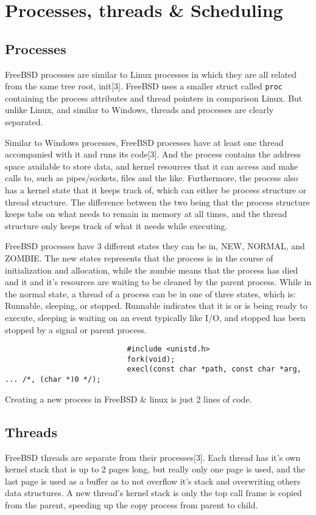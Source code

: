 \documentclass{article}
\begin{document}
\section{Processes, threads \& Scheduling}
\subsection{Processes}
	FreeBSD processes are similar to Linux processes in which they are all related from the same tree root, init[3]. FreeBSD uses a smaller struct called \texttt{proc} containing the process attributes and thread pointers in comparison Linux. But unlike Linux, and similar to Windows, threads and processes are clearly separated.

	Similar to Windows processes, FreeBSD processes have at least one thread accompanied with it and runs its code[3]. And the process contains the address space available to store data, and kernel resources that it can access and make calls to, such as pipes/sockets, files and the like. Furthermore, the process also has a kernel state that it keeps track of, which can either be process structure or thread structure. The difference between the two being that the process structure keeps tabs on what needs to remain in memory at all times, and the thread structure only keeps track of what it needs while executing.

	FreeBSD processes have 3 different states they can be in, NEW, NORMAL, and ZOMBIE. The new states represents that the process is in the course of initialization and allocation, while the zombie means that the process has died and it and it’s resources are waiting to be cleaned by the parent process. While in the normal state, a thread of a process can be in one of three states, which is: Runnable, sleeping, or stopped. Runnable indicates that it is or is being ready to execute, sleeping is waiting on an event typically like I/O, and stopped has been stopped by a signal or parent process. \newline
                            \begin{lstlisting}
                            #include <unistd.h>
                            fork(void);
                            execl(const char *path, const char *arg, ... /*, (char *)0 */);
                            \end{lstlisting}
                            Creating a new process in FreeBSD \& linux is just 2 lines of code.

\subsection{Threads}
    FreeBSD threads are separate from their processes[3]. Each thread has it’s own kernel stack that is up to 2 pages long, but really only one page is used, and the last page is used as a buffer as to not overflow it’s stack and overwriting others data structures. A new thread's kernel stack is only the top call frame is copied from the parent, speeding up the copy process from parent to child.
\end{document}
